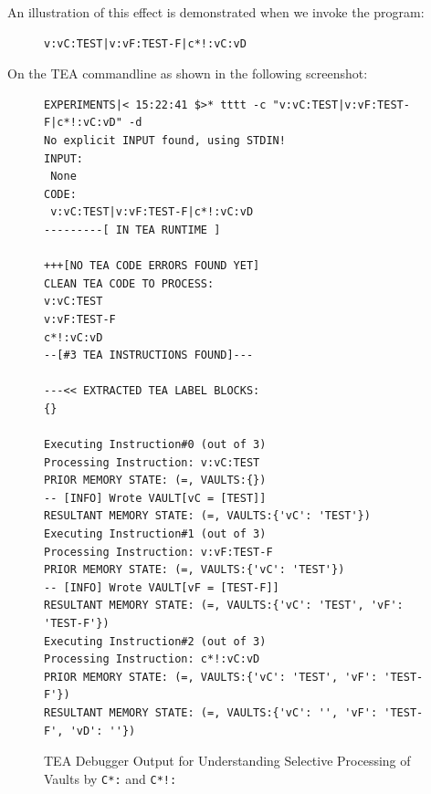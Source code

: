 \documentclass[a4paper, 18pt]{book} %
\begin{document}
An illustration of this effect is demonstrated when we invoke the program:


\begin{figure}[H]
 \Large
  \centering
  \begin{tcolorbox}[teaterminalstyle, title=TEA Program: explore selective processing of vaults by c*]
    \begin{lstlisting}[language=TEA]
v:vC:TEST|v:vF:TEST-F|c*!:vC:vD
   \end{lstlisting}
  \end{tcolorbox}
\end{figure}


On the TEA commandline as shown in the following screenshot:

\begin{figure}[H]
  \centering
  \begin{tcolorbox}[myterminalstyle, title=Selective Processing of Vaults by \texttt{C*:} and \texttt{C*!:}]
  \begin{lstlisting}
EXPERIMENTS|< 15:22:41 $>* tttt -c "v:vC:TEST|v:vF:TEST-F|c*!:vC:vD" -d
No explicit INPUT found, using STDIN!
INPUT:
 None
CODE:
 v:vC:TEST|v:vF:TEST-F|c*!:vC:vD
---------[ IN TEA RUNTIME ]

+++[NO TEA CODE ERRORS FOUND YET]
CLEAN TEA CODE TO PROCESS:
v:vC:TEST
v:vF:TEST-F
c*!:vC:vD
--[#3 TEA INSTRUCTIONS FOUND]---

---<< EXTRACTED TEA LABEL BLOCKS:
{}

Executing Instruction#0 (out of 3)
Processing Instruction: v:vC:TEST
PRIOR MEMORY STATE: (=, VAULTS:{})
-- [INFO] Wrote VAULT[vC = [TEST]]
RESULTANT MEMORY STATE: (=, VAULTS:{'vC': 'TEST'})
Executing Instruction#1 (out of 3)
Processing Instruction: v:vF:TEST-F
PRIOR MEMORY STATE: (=, VAULTS:{'vC': 'TEST'})
-- [INFO] Wrote VAULT[vF = [TEST-F]]
RESULTANT MEMORY STATE: (=, VAULTS:{'vC': 'TEST', 'vF': 'TEST-F'})
Executing Instruction#2 (out of 3)
Processing Instruction: c*!:vC:vD
PRIOR MEMORY STATE: (=, VAULTS:{'vC': 'TEST', 'vF': 'TEST-F'})
RESULTANT MEMORY STATE: (=, VAULTS:{'vC': '', 'vF': 'TEST-F', 'vD': ''})
  \end{lstlisting}
  \end{tcolorbox}
  \caption{TEA Debugger Output for Understanding Selective Processing of Vaults by \texttt{C*:} and \texttt{C*!:}}
  \label{FIGC7}
\end{figure}
\end{document}
